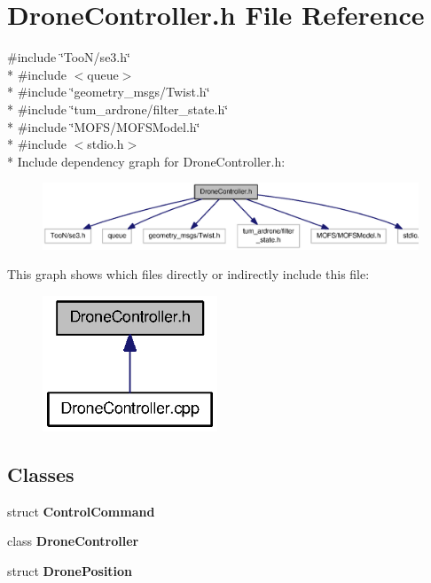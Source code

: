 \section{Drone\-Controller.\-h File Reference}
\label{DroneController_8h}
{\ttfamily \#include \char`\"{}Too\-N/se3.\-h\char`\"{}}\\*
{\ttfamily \#include $<$queue$>$}\\*
{\ttfamily \#include \char`\"{}geometry\-\_\-msgs/\-Twist.\-h\char`\"{}}\\*
{\ttfamily \#include \char`\"{}tum\-\_\-ardrone/filter\-\_\-state.\-h\char`\"{}}\\*
{\ttfamily \#include \char`\"{}M\-O\-F\-S/\-M\-O\-F\-S\-Model.\-h\char`\"{}}\\*
{\ttfamily \#include $<$stdio.\-h$>$}\\*
Include dependency graph for Drone\-Controller.\-h\-:\nopagebreak
\begin{figure}[H]
\begin{center}
\leavevmode
\includegraphics[width=350pt]{DroneController_8h__incl}
\end{center}
\end{figure}
This graph shows which files directly or indirectly include this file\-:\nopagebreak
\begin{figure}[H]
\begin{center}
\leavevmode
\includegraphics[width=148pt]{DroneController_8h__dep__incl}
\end{center}
\end{figure}
\subsection*{Classes}
\begin{DoxyCompactItemize}
\item 
struct {\bf Control\-Command}
\item 
class {\bf Drone\-Controller}
\item 
struct {\bf Drone\-Position}
\end{DoxyCompactItemize}
